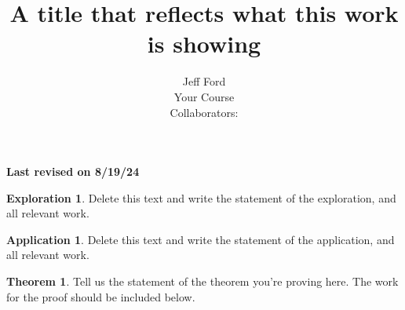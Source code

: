 \documentclass[12 pt]{article}
\theoremstyle{definition}
\newtheorem*{thm}{Theorem}
\newtheorem*{exploration}{Exploration}
\newtheorem*{app}{Application}
\newcommand\rev[1]{\noindent\textbf{Last revised on {#1}}\\}
\begin{document}
 
 
\title{A title that reflects what this work is showing}%
\author{Jeff Ford\\ %
Your Course\\ %
Collaborators: } %
 
\maketitle
\rev{8/19/24} %

\begin{exploration} 
Delete this text and write the statement of the exploration, and all relevant work.
\end{exploration}

\begin{app}
Delete this text and write the statement of the application, and all relevant work.
\end{app}

\begin{thm}
Tell us the statement of the theorem you're proving here. The work for the proof should be included below.
\end{thm}
\end{document}
